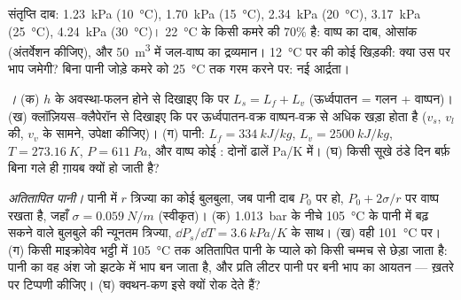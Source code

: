 \begin{exercise}[$\star\star$]\label{exo:b1:phase-changes:9}
संतृप्ति दाब: \qty{1.23}{kPa} (\qty{10}{\degreeCelsius}), \qty{1.70}{kPa}
(\qty{15}{\degreeCelsius}), \qty{2.34}{kPa} (\qty{20}{\degreeCelsius}), \qty{3.17}{kPa}
(\qty{25}{\degreeCelsius}), \qty{4.24}{kPa} (\qty{30}{\degreeCelsius})।
\qty{22}{\degreeCelsius} के किसी कमरे की  $70\%$ है: वाष्प
का दाब, ओसांक (अंतर्वेशन कीजिए), और \qty{50}{m^3} में जल-वाष्प का
द्रव्यमान। \qty{12}{\degreeCelsius} पर की कोई खिड़की: क्या उस पर भाप जमेगी?
बिना पानी जोड़े कमरे को \qty{25}{\degreeCelsius} तक गरम करने पर: नई
आर्द्रता।
\end{exercise}

\begin{exercise}[$\star\star\star$]\label{exo:b1:phase-changes:10}
\emph{।} (क) $h$ के अवस्था-फलन होने से दिखाइए कि 
पर $L_s = L_f + L_v$ (ऊर्ध्वपातन = गलन + वाष्पन)।
(ख) क्लॉज़ियस--क्लैपेरॉन से दिखाइए कि  पर ऊर्ध्वपातन-वक्र
वाष्पन-वक्र से अधिक खड़ा होता है ($v_s$, $v_l$ की, $v_v$ के सामने,
उपेक्षा कीजिए)। (ग) पानी: $L_f = \qty{334}{kJ/kg}$,
$L_v = \qty{2500}{kJ/kg}$, $T = \qty{273.16}{K}$, $P = \qty{611}{Pa}$, और वाष्प
कोई : दोनों ढालें \unit{Pa/K} में। (घ) किसी सूखे ठंडे दिन बर्फ़
बिना गले ही ग़ायब क्यों हो जाती है?
\end{exercise}

\begin{exercise}[$\star\star\star$]\label{exo:b1:phase-changes:11}
\emph{अतितापित पानी।} पानी में $r$ त्रिज्या का कोई बुलबुला, जब पानी दाब
$P_0$ पर हो, $P_0 + 2\sigma/r$ पर वाष्प रखता है, जहाँ
$\sigma = \qty{0.059}{N/m}$ (स्वीकृत)। (क) \qty{1.013}{bar} के
नीचे \qty{105}{\degreeCelsius} के पानी में बढ़ सकने वाले बुलबुले की न्यूनतम
त्रिज्या, $\dd P_s/\dd T = \qty{3.6}{kPa/K}$ के साथ।
(ख) वही \qty{101}{\degreeCelsius} पर।
(ग) किसी माइक्रोवेव भट्ठी में \qty{105}{\degreeCelsius} तक अतितापित पानी के
प्याले को किसी चम्मच से छेड़ा जाता है: पानी का वह अंश जो झटके में भाप बन
जाता है, और प्रति लीटर पानी पर बनी भाप का आयतन --- ख़तरे पर टिप्पणी कीजिए।
(घ) क्वथन-कण इसे क्यों रोक देते हैं?
\end{exercise}

